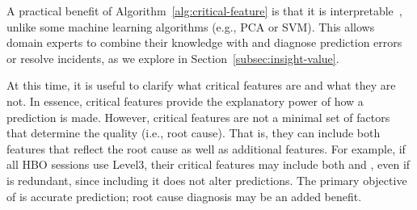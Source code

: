 A practical benefit of Algorithm~\ref{alg:critical-feature} 
is that it is interpretable~\cite{vellido2012making}, 
unlike some machine learning algorithms (e.g., PCA or SVM).
This allows domain experts to combine their knowledge 
with \dda
and diagnose prediction errors or resolve incidents, 
as we explore in Section~\ref{subsec:insight-value}. 

At this time, it is useful to clarify what critical features 
are and what they are not.
In essence, critical features provide the explanatory 
power of how a prediction is made.
However, critical features are not a minimal set of 
factors that determine the quality (i.e., root cause). 
That is, they can include both features that reflect 
the root cause as well as additional features.
For example, if all HBO sessions use Level3, their 
critical features may include both \fCDN and \fSite, 
even if \fCDN is redundant, since including it does 
not alter predictions. 
The primary objective of \dda is accurate prediction; 
root cause diagnosis may be an added benefit.





